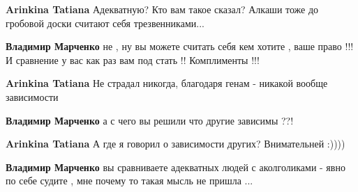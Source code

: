 \begin{itemize}
\begin{itemize}
\textbf{Arinkina Tatiana} Адекватную? Кто вам такое сказал? Алкаши тоже до гробовой доски считают себя трезвенниками...

 
\textbf{Владимир Марченко} не , ну вы можете считать себя кем хотите , ваше право !!! И сравнение у вас как раз вам под стать !! Комплименты !!!

 
\textbf{Arinkina Tatiana} Не страдал никогда, благодаря генам - никакой вообще зависимости

 
\textbf{Владимир Марченко} а с чего вы решили что другие зависимы ??!

 
\textbf{Arinkina Tatiana} А где я говорил о зависимости других? Внимательней :))))

 
\textbf{Владимир Марченко} вы сравниваете адекватных людей с аколголиками - явно по себе судите , мне почему то такая мысль не пришла ...
\end{itemize}

 


\end{itemize}
